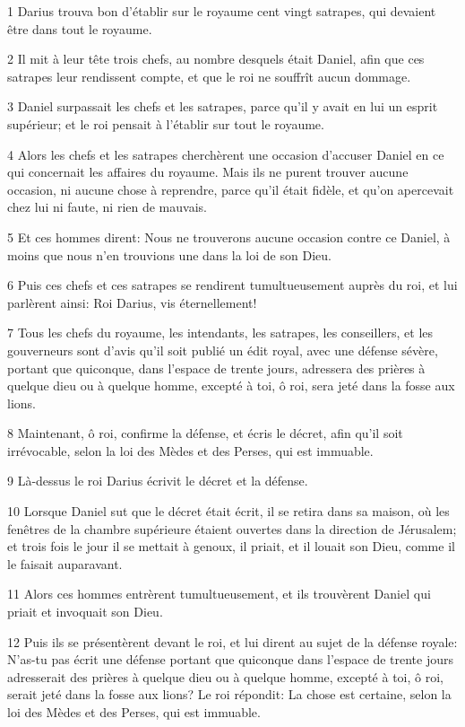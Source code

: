 \par 1 Darius trouva bon d'établir sur le royaume cent vingt satrapes, qui devaient être dans tout le royaume.
\par 2 Il mit à leur tête trois chefs, au nombre desquels était Daniel, afin que ces satrapes leur rendissent compte, et que le roi ne souffrît aucun dommage.
\par 3 Daniel surpassait les chefs et les satrapes, parce qu'il y avait en lui un esprit supérieur; et le roi pensait à l'établir sur tout le royaume.
\par 4 Alors les chefs et les satrapes cherchèrent une occasion d'accuser Daniel en ce qui concernait les affaires du royaume. Mais ils ne purent trouver aucune occasion, ni aucune chose à reprendre, parce qu'il était fidèle, et qu'on apercevait chez lui ni faute, ni rien de mauvais.
\par 5 Et ces hommes dirent: Nous ne trouverons aucune occasion contre ce Daniel, à moins que nous n'en trouvions une dans la loi de son Dieu.
\par 6 Puis ces chefs et ces satrapes se rendirent tumultueusement auprès du roi, et lui parlèrent ainsi: Roi Darius, vis éternellement!
\par 7 Tous les chefs du royaume, les intendants, les satrapes, les conseillers, et les gouverneurs sont d'avis qu'il soit publié un édit royal, avec une défense sévère, portant que quiconque, dans l'espace de trente jours, adressera des prières à quelque dieu ou à quelque homme, excepté à toi, ô roi, sera jeté dans la fosse aux lions.
\par 8 Maintenant, ô roi, confirme la défense, et écris le décret, afin qu'il soit irrévocable, selon la loi des Mèdes et des Perses, qui est immuable.
\par 9 Là-dessus le roi Darius écrivit le décret et la défense.
\par 10 Lorsque Daniel sut que le décret était écrit, il se retira dans sa maison, où les fenêtres de la chambre supérieure étaient ouvertes dans la direction de Jérusalem; et trois fois le jour il se mettait à genoux, il priait, et il louait son Dieu, comme il le faisait auparavant.
\par 11 Alors ces hommes entrèrent tumultueusement, et ils trouvèrent Daniel qui priait et invoquait son Dieu.
\par 12 Puis ils se présentèrent devant le roi, et lui dirent au sujet de la défense royale: N'as-tu pas écrit une défense portant que quiconque dans l'espace de trente jours adresserait des prières à quelque dieu ou à quelque homme, excepté à toi, ô roi, serait jeté dans la fosse aux lions? Le roi répondit: La chose est certaine, selon la loi des Mèdes et des Perses, qui est immuable.
